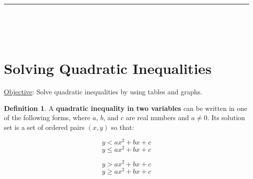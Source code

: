 \documentclass{report}
\theoremstyle{definition}
\newtheorem{definition}{\bf Definition}[section]
\begin{document}
\hrule

\vfill
\small
\color{red}
\begin{flushright}
\\
\\
\\
\end{flushright}
\color{black}
\normalsize

 \newpage

 \section{  Solving Quadratic Inequalities }
 \setcounter{example}{0}
 \setcounter{definition}{0}
 \hfill \underline{Objective}: Solve quadratic inequalities by using tables and graphs. \\
 \begin{definition}
 A \textbf{quadratic inequality in two variables} can be written in one of the following forms, where $a$, $b$, and $c$ are real numbers and $a\neq 0$. Its solution set is a set of ordered pairs $(x,y)$ so that:
 \end{definition}
 \vspace{-1cm}
 
\hfill
\begin{minipage}[t]{0.3\linewidth}
 \[y<ax^2+bx+c\]
 \[y\leq ax^2+bx+c\]
\end{minipage}
\begin{minipage}[t]{0.3\linewidth}
 \[y> ax^2+bx+c\]
 \[y\geq ax^2+bx+c\]
\end{minipage}\hfill
\hfill
 
 \vspace{-0.5cm}
 
\end{document}
